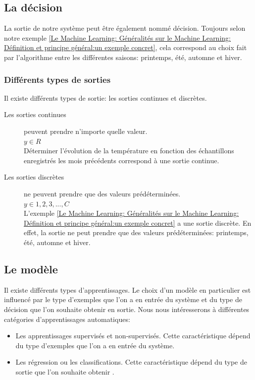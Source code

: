 \subsection{La décision}
\label{Le Machine Learning: Généralités sur le Machine Learning: La décision}
La sortie de notre système peut être également nommé décision. Toujours selon notre exemple \ref{Le Machine Learning: Généralités sur le Machine Learning: Définition et principe général:un exemple concret}, cela correspond au choix fait par l'algorithme entre les différentes saisons: printemps, été, automne et hiver.  

\subsubsection{Différents types de sorties}
Il existe différents types de sortie: les sorties continues et discrètes.

\begin{description}
	\item [Les sorties continues] peuvent prendre n'importe quelle valeur. \\
	 $y \in R$ \\
	 Déterminer l'évolution de la température en fonction des échantillons enregistrés les mois précédents correspond à une sortie continue.
	\item [Les sorties discrètes] ne peuvent prendre que des valeurs prédéterminées. \\
	 $y \in {1, 2, 3, ...,C}$ \\
	 L'exemple \ref{Le Machine Learning: Généralités sur le Machine Learning: Définition et principe général:un exemple concret} a une sortie discrète. En effet, la sortie ne peut prendre que des valeurs prédéterminées: printemps, été, automne et hiver.
\end{description}


\subsection{Le modèle}
\label{Le Machine Learning: Généralités sur le Machine Learning: Le modèle}
Il existe différents types d'apprentissages. Le choix d'un modèle en particulier est influencé par le type d'exemples que l'on a en entrée du système et du type de décision que l'on souhaite obtenir en sortie. Nous nous intéresserons à différentes catégories d'apprentissages automatiques: 
\begin{itemize}
	\item Les apprentissages supervisés et non-supervisés. Cette caractéristique dépend du type d'exemples que l'on a en entrée du système.
	\item Les régression ou les classifications. Cette caractéristique dépend du type de sortie que l'on souhaite obtenir . 
\end{itemize}


